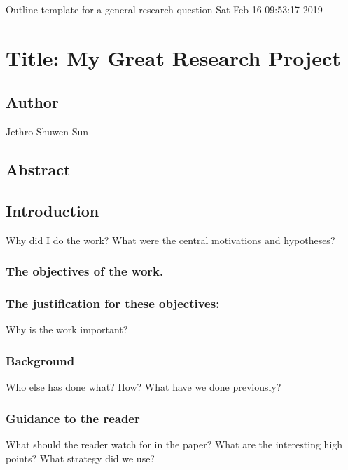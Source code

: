 \documentclass[11pt]{article}
\author{Jethro Shuwen Sun}
\date{\today}
\title{}
\begin{document}
\tableofcontents

Outline template for a general research question
Sat Feb 16 09:53:17 2019

\section{Title: My Great Research Project}
\label{sec:orgd228933}


\subsection{Author}
\label{sec:org5f270d2}
Jethro Shuwen Sun

\subsection{Abstract}
\label{sec:org3dc16d7}
\vspace*{120px}

\subsection{Introduction}
\label{sec:org3153e59}
Why did I do the work? What were the central motivations and hypotheses?
\vspace*{120px}

\subsubsection{The objectives of the work.}
\label{sec:org436b9b6}
\vspace*{120px}

\subsubsection{The justification for these objectives:}
\label{sec:orga504b57}
Why is the work important? 
\vspace*{120px}

\subsubsection{Background}
\label{sec:org9af8c5a}
Who else has done what? How? What have we done previously? 
\vspace*{120px}

\subsubsection{Guidance to the reader}
\label{sec:org7916da9}
What should the reader watch for in the paper? What are the interesting high
points? What strategy did we use?
\vspace*{120px}
\end{document}
